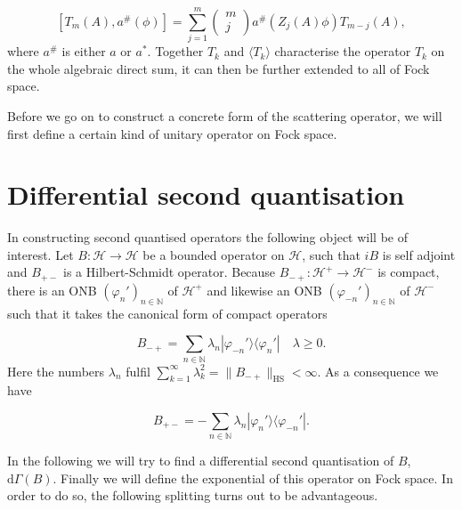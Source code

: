 \documentclass[b5paper,draft,openbib,12pt]{memoir}
\begin{document}
\begin{equation}\label{logarithmic lift condition}
\left[T_m(A) , a^\# (\phi)\right]= \sum_{j=1}^{m} \begin{pmatrix} m \\ j \end{pmatrix} a^\# \left(Z_j (A) \phi \right) T_{m-j}(A), 
\end{equation}
where \(a^\#\) is either \(a\) or \(a^*\). Together \(T_k\) and \(\langle T_k\rangle\) characterise the operator \(T_k\) on the whole algebraic
direct sum, it can then be further extended to all of Fock space.

Before we go on to construct a concrete form of the scattering operator, we will first define a certain kind of unitary operator on Fock space.

\section{Differential second quantisation}

In constructing second quantised operators the following object will be of interest. Let \(B:\mathcal{H}\rightarrow\mathcal{H}\) be a bounded
operator on \(\mathcal{H}\), such that \(i B\) is self adjoint and \(B_{+-}\) is a Hilbert-Schmidt operator. 
Because \(B_{-+}:\mathcal{H}^+\rightarrow \mathcal{H}^-\) is compact, there is an ONB \((\varphi_n')_{n\in\mathbb{N}}\) 
of \(\mathcal{H}^+\) and likewise an ONB \((\varphi_{-n}')_{n\in\mathbb{N}}\) of \(\mathcal{H}^-\) such that it takes the canonical form 
of compact operators

\begin{equation}
B_{-+} = \sum_{n\in\mathbb{N}} \lambda_n |\varphi_{-n}'\rangle \langle \varphi_{n}'| \quad \lambda \ge 0.
\end{equation}
Here the numbers \(\lambda_n\) fulfil \(\sum_{k=1}^\infty \lambda_k^2 = \|B_{-+}\|_{\text{HS}}<\infty\). As a consequence we have

\begin{equation}
B_{+-} = -\sum_{n\in\mathbb{N}} \lambda_n |\varphi_{n}'\rangle \langle \varphi_{-n}'|.
\end{equation}

In the following we will try to find a differential second quantisation of \(B\), \(\mathrm{d}\Gamma(B)\). 
Finally we will define the exponential of this operator on Fock space. In order to do so, the following splitting turns out to be advantageous. 
\end{document}
